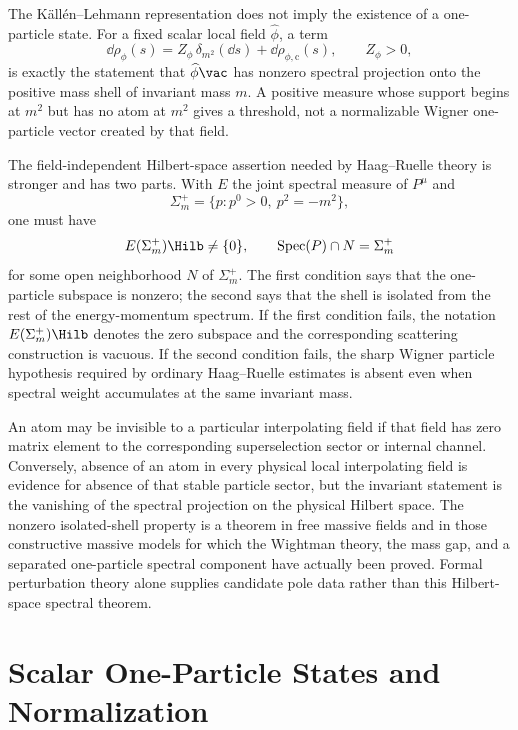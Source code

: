 \begin{remark}
\label{rem:kallen-lehmann-mass-shell-existence-status}
The K\"all\'en--Lehmann representation does not imply the existence of a
one-particle state.  For a fixed scalar local field \(\widehat\phi\), a term
\[
  \dd\rho_\phi(s)=Z_\phi\,\delta_{m^2}(\dd s)+\dd\rho_{\phi,\mathrm c}(s),
  \qquad Z_\phi>0,
\]
is exactly the statement that \(\widehat\phi\vac\) has nonzero spectral
projection onto the positive mass shell of invariant mass \(m\).  A positive
measure whose support begins at \(m^2\) but has no atom at \(m^2\) gives a
threshold, not a normalizable Wigner one-particle vector created by that
field.

The field-independent Hilbert-space assertion needed by Haag--Ruelle theory is
stronger and has two parts.  With \(E\) the joint spectral measure of
\(P^\mu\) and
\[
  \Sigma_m^+=\{p:p^0>0,\ p^2=-m^2\},
\]
one must have
\[
  E(\Sigma_m^+)\Hilb\ne\{0\},
  \qquad
  \operatorname{Spec}(P)\cap N=\Sigma_m^+
\]
for some open neighborhood \(N\) of \(\Sigma_m^+\).  The first condition says
that the one-particle subspace is nonzero; the second says that the shell is
isolated from the rest of the energy-momentum spectrum.  If the first condition
fails, the notation \(E(\Sigma_m^+)\Hilb\) denotes the zero subspace and the
corresponding scattering construction is vacuous.  If the second condition
fails, the sharp Wigner particle hypothesis required by ordinary
Haag--Ruelle estimates is absent even when spectral weight accumulates at the
same invariant mass.

An atom may be invisible to a particular interpolating field if that field has
zero matrix element to the corresponding superselection sector or internal
channel.  Conversely, absence of an atom in every physical local
interpolating field is evidence for absence of that stable particle sector, but
the invariant statement is the vanishing of the spectral projection on the
physical Hilbert space.  The nonzero isolated-shell property is a theorem in
free massive fields and in those constructive massive models for which the
Wightman theory, the mass gap, and a separated one-particle spectral component
have actually been proved.  Formal perturbation theory alone supplies
candidate pole data rather than this Hilbert-space spectral theorem.
\end{remark}

\section{Scalar One-Particle States and Normalization}

